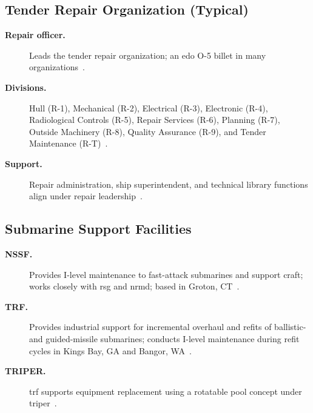 \documentclass[../main.tex]{subfiles}
\begin{document}
\subsection{Tender Repair Organization (Typical)}
\begin{description}
  \item[\textbf{Repair officer.}] Leads the tender repair organization; an \ac{edo} O-5 billet in many organizations~\autocite{edo-4-1-1-fleet-maint-assets-2025}.
  \item[\textbf{Divisions.}] Hull (R-1), Mechanical (R-2), Electrical (R-3), Electronic (R-4), Radiological Controls (R-5), Repair Services (R-6), Planning (R-7), Outside Machinery (R-8), Quality Assurance (R-9), and Tender Maintenance (R-T)~\autocite{edo-4-1-1-fleet-maint-assets-2025}.
  \item[\textbf{Support.}] Repair administration, ship superintendent, and technical library functions align under repair leadership~\autocite{edo-4-1-1-fleet-maint-assets-2025}.
\end{description}

\subsection{Submarine Support Facilities}
\begin{description}
  \item[\textbf{NSSF.}] Provides I-level maintenance to fast-attack submarines and support craft; works closely with \ac{rsg} and \ac{nrmd}; based in Groton, CT~\autocite{edo-4-1-1-fleet-maint-assets-2025}.
  \item[\textbf{TRF.}] Provides industrial support for incremental overhaul and refits of ballistic- and guided-missile submarines; conducts I-level maintenance during refit cycles in Kings Bay, GA and Bangor, WA~\autocite{edo-4-1-1-fleet-maint-assets-2025}.
  \item[\textbf{TRIPER.}] \ac{trf} supports equipment replacement using a rotatable pool concept under \ac{triper}~\autocite{edo-4-1-1-fleet-maint-assets-2025}.
\end{description}
\end{document}
